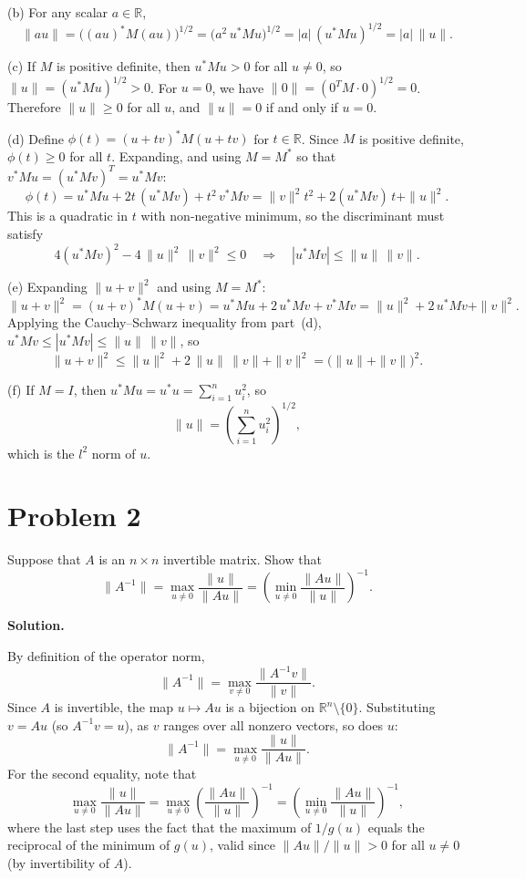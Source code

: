 \documentclass[letterpaper, 11pt]{article}
\newcommand{\R}{\mathbb{R}}   %
\newcommand{\1}{\mathds{1}}	%
\theoremstyle{definition}
\begin{document}
\medskip

(b) For any scalar $a \in \R$,
\[
\|au\| = \bigl((au)^* M (au)\bigr)^{1/2} = \bigl(a^2\, u^* M u\bigr)^{1/2} = |a|\,(u^*Mu)^{1/2} = |a|\,\|u\|.
\]

\medskip

(c) If $M$ is positive definite, then $u^*Mu > 0$ for all $u \neq 0$, so $\|u\| = (u^*Mu)^{1/2} > 0$. For $u = 0$, we have $\|0\| = (0^T M \cdot 0)^{1/2} = 0$. Therefore $\|u\| \geq 0$ for all $u$, and $\|u\| = 0$ if and only if $u = 0$.

\medskip

(d) Define $\phi(t) = (u + tv)^* M(u + tv)$ for $t \in \R$. Since $M$ is positive definite, $\phi(t) \geq 0$ for all $t$. Expanding, and using $M = M^*$ so that $v^*Mu = (u^*Mv)^T = u^*Mv$:
\[
\phi(t) = u^*Mu + 2t\,(u^*Mv) + t^2\,v^*Mv = \|v\|^2 t^2 + 2(u^*Mv)\,t + \|u\|^2.
\]
This is a quadratic in $t$ with non-negative minimum, so the discriminant must satisfy
\[
4(u^*Mv)^2 - 4\,\|u\|^2\,\|v\|^2 \leq 0 \quad \Longrightarrow \quad |u^*Mv| \leq \|u\|\,\|v\|.
\]

\medskip

(e) Expanding $\|u+v\|^2$ and using $M = M^*$:
\[
\|u + v\|^2 = (u+v)^*M(u+v) = u^*Mu + 2\,u^*Mv + v^*Mv = \|u\|^2 + 2\,u^*Mv + \|v\|^2.
\]
Applying the Cauchy--Schwarz inequality from part~(d), $u^*Mv \leq |u^*Mv| \leq \|u\|\,\|v\|$, so
\[
\|u+v\|^2 \leq \|u\|^2 + 2\,\|u\|\,\|v\| + \|v\|^2 = \bigl(\|u\| + \|v\|\bigr)^2.
\]

\medskip

(f) If $M = I$, then $u^*Mu = u^*u = \sum_{i=1}^{n} u_i^2$, so
\[
\|u\| = \left(\sum_{i=1}^{n} u_i^2\right)^{1/2},
\]
which is the $l^2$ norm of $u$.
\section*{Problem 2}

Suppose that $A$ is an $n \times n$ invertible matrix. Show that
\[
\|A^{-1}\| = \max_{u \neq 0} \frac{\|u\|}{\|Au\|} = \left(\min_{u \neq 0} \frac{\|Au\|}{\|u\|}\right)^{-1}.
\]

\medskip

\textbf{Solution.}

By definition of the operator norm,
\[
\|A^{-1}\| = \max_{v \neq 0} \frac{\|A^{-1}v\|}{\|v\|}.
\]
Since $A$ is invertible, the map $u \mapsto Au$ is a bijection on $\R^n \setminus \{0\}$. Substituting $v = Au$ (so $A^{-1}v = u$), as $v$ ranges over all nonzero vectors, so does $u$:
\[
\|A^{-1}\| = \max_{u \neq 0} \frac{\|u\|}{\|Au\|}.
\]
For the second equality, note that
\[
\max_{u \neq 0} \frac{\|u\|}{\|Au\|} = \max_{u \neq 0} \left(\frac{\|Au\|}{\|u\|}\right)^{-1} = \left(\min_{u \neq 0} \frac{\|Au\|}{\|u\|}\right)^{-1},
\]
where the last step uses the fact that the maximum of $1/g(u)$ equals the reciprocal of the minimum of $g(u)$, valid since $\|Au\|/\|u\| > 0$ for all $u \neq 0$ (by invertibility of $A$).
\end{document}
